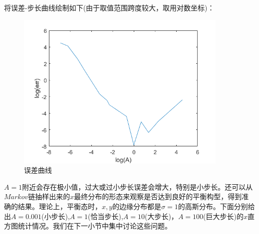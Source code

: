 \documentclass[UTF8]{ctexart}
\begin{document}
\begin{flushleft}
		
		将误差-步长曲线绘制如下(由于取值范围跨度较大，取用对数坐标)：
		
			\begin{figure}[H]
				\centering  %
				\includegraphics[width=4in]{../result/err.png}
				\caption{误差曲线}
			\end{figure}
		
	\begin{flushleft}
			$A=1$附近会存在极小值，过大或过小步长误差会增大，特别是小步长。还可以从$Markov$链抽样出来的$x$最终分布的形态来观察是否达到良好的平衡构型，得到准确的结果。理论上，平衡态时，$x,y$的边缘分布都是$\sigma=1$的高斯分布。下面分别给出$A=0.001$(小步长),$A=1$(恰当步长),$A=10$(大步长)，$A=100$(巨大步长)的$x$直方图统计情况。我们在下一小节中集中讨论这些问题。
	\end{flushleft}
		

\end{flushleft}
\end{document}
